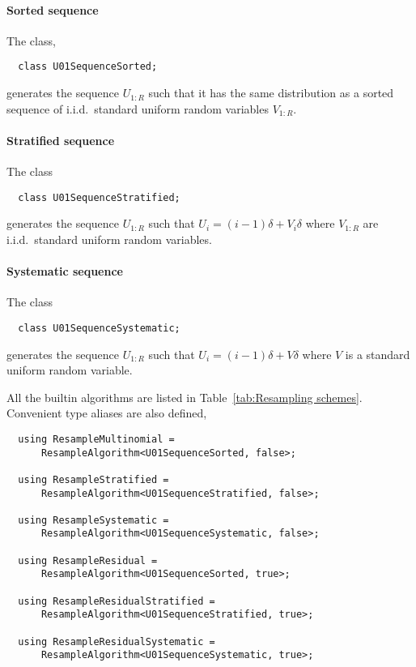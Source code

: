 \paragraph{Sorted sequence}

The class,
\begin{Verbatim}
  class U01SequenceSorted;
\end{Verbatim}
generates the sequence $U_{1:R}$ such that it has the same distribution as a
sorted sequence of i.i.d.\ standard uniform random variables $V_{1:R}$.

\paragraph{Stratified sequence}

The class
\begin{Verbatim}
  class U01SequenceStratified;
\end{Verbatim}
generates the sequence $U_{1:R}$ such that $U_i = (i - 1)\delta + V_i\delta$
where $V_{1:R}$ are i.i.d.\ standard uniform random variables.

\paragraph{Systematic sequence}

The class
\begin{Verbatim}
  class U01SequenceSystematic;
\end{Verbatim}
generates the sequence $U_{1:R}$ such that $U_i = (i - 1)\delta + V\delta$
where $V$ is a standard uniform random variable.

All the builtin algorithms are listed in Table~\ref{tab:Resampling schemes}.
Convenient type aliases are also defined,
\begin{Verbatim}
  using ResampleMultinomial =
      ResampleAlgorithm<U01SequenceSorted, false>;

  using ResampleStratified =
      ResampleAlgorithm<U01SequenceStratified, false>;

  using ResampleSystematic =
      ResampleAlgorithm<U01SequenceSystematic, false>;

  using ResampleResidual =
      ResampleAlgorithm<U01SequenceSorted, true>;

  using ResampleResidualStratified =
      ResampleAlgorithm<U01SequenceStratified, true>;

  using ResampleResidualSystematic =
      ResampleAlgorithm<U01SequenceSystematic, true>;
\end{Verbatim}

